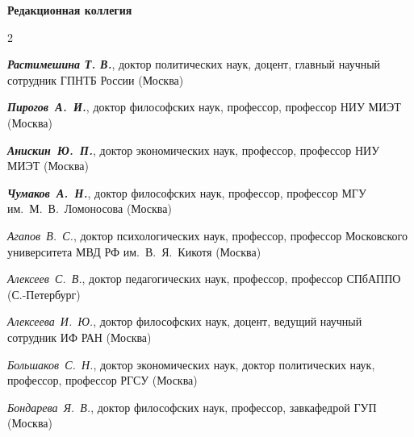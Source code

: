 


\vspace*{-4em}

\begin{center}
    \textbf{Редакционная коллегия}
\end{center}



\begin{multicols}{2}
   \begin{flushleft}
        
    \scriptsize



    \noindent     \textit{\textbf{Растимешина Т. В.}}, доктор политических наук, доцент,
    главный научный сотрудник ГПНТБ России (Москва)


    \noindent     \textit{\textbf{Пирогов А. И.}}, доктор философских наук, профессор, профессор НИУ МИЭТ (Москва)
    
    
    \noindent     \textit{\textbf{Анискин Ю. П.}}, доктор экономических наук, профессор, профессор НИУ МИЭТ (Москва)

    
    
    \noindent     \textit{\textbf{Чумаков А. Н.}}, доктор философских наук, профессор, профессор МГУ им. М. В. Ломоносова (Москва) 

    
    
    \noindent  \textit{Агапов В. С.}, доктор психологических наук, профессор, профессор Московского университета МВД РФ им. В. Я. Кикотя (Москва)
    
    \noindent  \textit{Алексеев С. В.}, доктор педагогических наук, профессор, профессор СПбАППО (С.-Петербург)
    
    \noindent \textit{Алексеева И. Ю.}, доктор философских наук, доцент, ведущий научный сотрудник ИФ РАН (Москва)
    
    \noindent \textit{Большаков С. Н.}, доктор экономических наук, доктор политических наук, профессор, профессор РГСУ (Москва)
    
    \noindent \textit{Бондарева Я. В.}, доктор философских наук, профессор, завкафедрой ГУП (Москва)



\end{flushleft}
\end{multicols}
